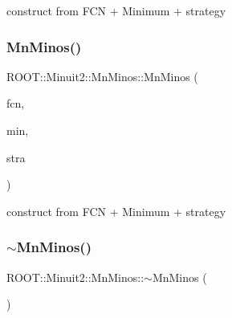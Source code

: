construct from F\+CN + Minimum + strategy 

\mbox{\label{classROOT_1_1Minuit2_1_1MnMinos_a80f912ade0dd48d937bc04b14e28623c}} 
\subsubsection{\texorpdfstring{MnMinos()}{MnMinos()}\hspace{0.1cm}{\footnotesize\ttfamily [4/6]}}
{\footnotesize\ttfamily R\+O\+O\+T\+::\+Minuit2\+::\+Mn\+Minos\+::\+Mn\+Minos (\begin{DoxyParamCaption}\item[{const \mbox{\hyperlink{classROOT_1_1Minuit2_1_1FCNBase}{F\+C\+N\+Base}} \&}]{fcn,  }\item[{const \mbox{\hyperlink{classROOT_1_1Minuit2_1_1FunctionMinimum}{Function\+Minimum}} \&}]{min,  }\item[{const \mbox{\hyperlink{classROOT_1_1Minuit2_1_1MnStrategy}{Mn\+Strategy}} \&}]{stra }\end{DoxyParamCaption})}



construct from F\+CN + Minimum + strategy 

\mbox{\label{classROOT_1_1Minuit2_1_1MnMinos_a64625d0dd4308a7c8fb8930c980f11bd}} 
\subsubsection{\texorpdfstring{$\sim$MnMinos()}{~MnMinos()}\hspace{0.1cm}{\footnotesize\ttfamily [2/3]}}
{\footnotesize\ttfamily R\+O\+O\+T\+::\+Minuit2\+::\+Mn\+Minos\+::$\sim$\+Mn\+Minos (\begin{DoxyParamCaption}{ }\end{DoxyParamCaption})\hspace{0.3cm}{\ttfamily [inline]}}

\mbox{\label{classROOT_1_1Minuit2_1_1MnMinos_ac64ec75423efa6e473ee722f08f47eb4}} 
